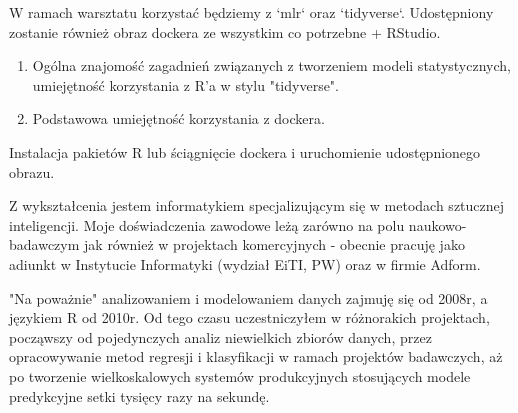 \documentclass[\main/boa.tex]{subfiles}
\begin{document}
\pakiety W ramach warsztatu korzystać będziemy z `mlr` oraz `tidyverse`. Udostępniony zostanie również obraz dockera ze wszystkim co potrzebne + RStudio.

\umiejetnosci\begin{enumerate}
	\item Ogólna znajomość zagadnień związanych z tworzeniem modeli statystycznych, umiejętność korzystania z R'a w stylu "tidyverse". 
	\item Podstawowa umiejętność korzystania z dockera.
\end{enumerate}

\wymagania Instalacja pakietów R lub ściągnięcie dockera i uruchomienie udostępnionego obrazu.

\sylwetkaprowadzacego Z wykształcenia jestem informatykiem specjalizującym się w metodach sztucznej inteligencji. Moje doświadczenia zawodowe leżą zarówno na polu naukowo-badawczym jak również w projektach komercyjnych - obecnie pracuję jako adiunkt w Instytucie Informatyki (wydział EiTI, PW) oraz w firmie Adform.

"Na poważnie" analizowaniem i modelowaniem danych zajmuję się od 2008r, a językiem R od 2010r. Od tego czasu uczestniczyłem w różnorakich projektach, począwszy od pojedynczych analiz niewielkich zbiorów danych, przez opracowywanie metod regresji i klasyfikacji w ramach projektów badawczych, aż po tworzenie wielkoskalowych systemów produkcyjnych stosujących modele predykcyjne setki tysięcy razy na sekundę.
\end{document}
